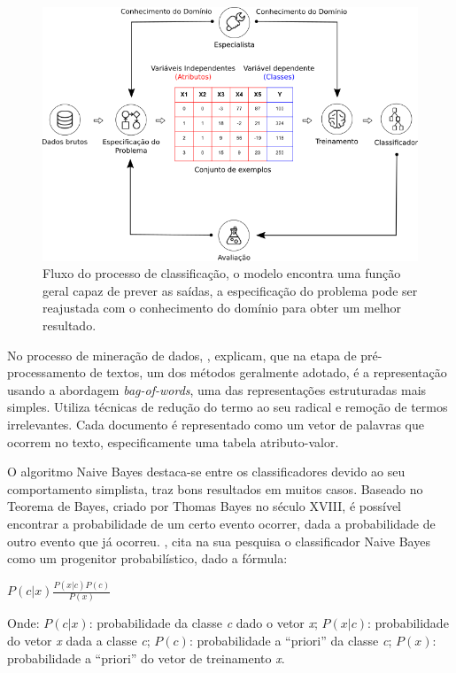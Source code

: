 \begin{figure}[H]
\begin{center}
    \includegraphics[scale=0.60]{images/processo_classificacao.png}
\end{center}
\caption{Fluxo do processo de classificação, o modelo encontra uma função geral 
capaz de prever as saídas, a especificação do problema pode ser reajustada com 
o conhecimento do domínio para obter um melhor resultado.}
\label{figure:processo_classificacao}
\end{figure}

No processo de mineração de dados, , explicam, 
que na etapa de pré-processamento de textos, um dos métodos geralmente adotado, 
é a representação usando a abordagem \textit{bag-of-words}, uma das 
representações estruturadas mais simples. Utiliza técnicas de redução do termo 
ao seu radical e remoção de termos irrelevantes. Cada documento é representado 
como um vetor de palavras que ocorrem no texto, especificamente uma tabela 
atributo-valor. 

O algoritmo Naive Bayes destaca-se entre os classificadores devido ao seu 
comportamento simplista, traz bons resultados em muitos casos. Baseado no 
Teorema de Bayes, criado por Thomas Bayes no século XVIII, é possível encontrar 
a probabilidade de um certo evento ocorrer, dada a probabilidade de outro 
evento que já ocorreu. , cita na sua pesquisa o 
classificador Naive Bayes como um progenitor probabilístico, dado a fórmula:
\begin{center}
\( \textit{P}(c|x)\frac{\textit{P}(x|c)\textit{P}(c)}{\textit{P}(x)} \)
\end{center}
Onde: \(\textit{P}(c|x)\): probabilidade da classe \textit{c} dado o vetor 
\textit{x}; \(\textit{P}(x|c)\): probabilidade do vetor \textit{x} dada a 
classe \textit{c}; \(\textit{P}(c)\): probabilidade a ``priori'' da classe 
\textit{c}; \(\textit{P}(x)\): probabilidade a ``priori'' do vetor de 
treinamento \textit{x}.

